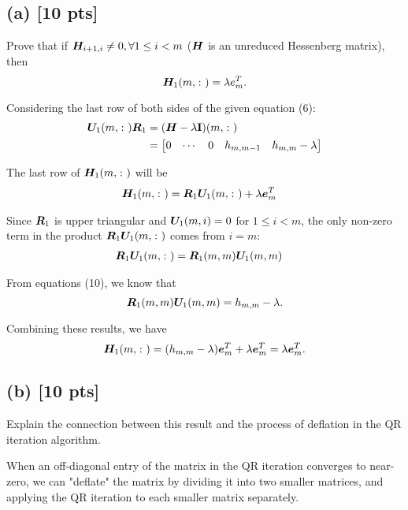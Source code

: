 \documentclass[twoside,10pt]{article}
\begin{document}
\subsection*{(a) [10 pts]}
Prove that if $\bm{H}_{i + 1, i} \neq  0, \forall 1 \leq i < m$ ($\bm{H}$ is an unreduced Hessenberg matrix), then 
\begin{equation}
  \mtx{H}_1\left(m, \colon\right) = \lambda e_m^{T}. 
\end{equation}

  Considering the last row of both sides of the given equation (6):
  \begin{align}
    \bm{U}_1(m, \colon) \bm{R}_1 &= (\bm{H} - \lambda \mathbf{I})(m, \colon) \\
    &= \begin{bmatrix} 0 & \cdots & 0 & h_{m,m-1} & h_{m,m} - \lambda \end{bmatrix}
  \end{align}
  
  The last row of $\bm{H}_1(m, \colon)$ will be
  \begin{align*}
    \bm{H}_1(m, \colon) &= \bm{R}_1 \bm{U}_1(m, \colon) + \lambda \bm{e}_m^T
  \end{align*}
  
  Since $\bm{R}_1$ is upper triangular and $\bm{U}_1(m, i) = 0$ for $1 \leq i < m$, the only non-zero term in the product $\bm{R}_1 \bm{U}_1(m, \colon)$ comes from $i = m$:
  \begin{align*}
    \bm{R}_1 \bm{U}_1(m, \colon) &= \bm{R}_1(m, m) \bm{U}_1(m, m)
  \end{align*}
  
  From equations (10), we know that
  \begin{equation}
    \bm{R}_1(m, m) \bm{U}_1(m, m) = h_{m, m} - \lambda.
  \end{equation}
  
  Combining these results, we have
  $$\bm{H}_1(m, \colon) = (h_{m, m} - \lambda) \bm{e}_m^T + \lambda \bm{e}_m^T = \lambda \bm{e}_m^T.$$
  
\subsection*{(b) [10 pts]}
Explain the connection between this result and the process of deflation in the QR iteration algorithm. 

\quad When an off-diagonal entry of the matrix in the QR iteration converges to near-zero, we can "deflate" the matrix by dividing it into two smaller matrices, and applying the QR iteration to each smaller matrix separately.
\end{document}
